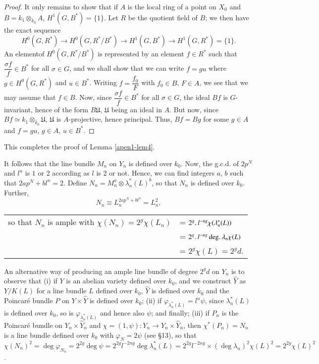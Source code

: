\begin{proof}
It only remains to show that if $A$ is the local ring of a point on $X_0$ and $B = k_1 \otimes_{k_0} A$, $H^1 (G, B^*) = \{1\}$. Let $R$ be the quotient field of $B$; we then have the exact sequence
$$
H^0 (G, R^*) \to H^0 (G, R^*/ B^*) \to H^1 (G, B^*) \to H^1 (G, R^*) = \{1\}.
$$
An element\pageoriginale of $H^0 (G, R^*/B^*)$ is represented by an element $f \in R^*$ such that $\dfrac{\sigma f}{f} \in B^*$ for all $\sigma \in G$, and we shall show that we can write $f= gu$ where $g \in H^0 (G, R^*)$ and $u \in B^*$. Writing $f = \dfrac{f_0}{F}$ with $f_0 \in B$, $F \in A$, we see that we may assume that $f \in B$. Now, since $\dfrac{\sigma f}{f} \in B^*$ for all $\sigma \in G$, the ideal $Bf$ is $G$-invariant, hence of the form $B\mathfrak{U}$, $\mathfrak{U}$ being an ideal in $A$. But now, since $Bf \simeq k_1 \otimes_{k_0} \mathfrak{U}$, $\mathfrak{U}$ is $A$-projective, hence principal. Thus, $Bf = Bg$ for some $g \in A$ and $f = gu$, $g \in A$, $u \in B^*$.
\end{proof}

This completes the proof of Lemma \ref{apen1-lem4}.

It follows that the line bundle $M_n$ on $Y_n$ is defined over $k_0$. Now, the g.c.d. of $2 p^N$ and $l^n$ is $1$ or 2 according as $l$ is 2 or not. Hence, we can find integers $a$, $b$ such that $2ap^N + bl^n =2$. Define $N_n = M^a_n \otimes \lambda^*_n(L)^b$, so that $N_n$ is defined over $k_0$. Further,
$$
N_n \equiv L^{2ap^N+bl^n}_n  = L^2_n,
$$
\begin{tabular}{r@{\;}l}
so that $N_n$ is ample with $\chi(N_n) = 2^g \chi(L_n)$  & = $2^g \ldotp l^{-ng} \chi (\lambda^*_n (L))$\\
& = $2^g \ldotp l^{-ng} \deg \ldotp \lambda_n \chi(L)$\\
& = $2^g \chi (L) = 2^g d$.
\end{tabular}

An alternative way of producing an ample line bundle of degree $2^gd$ on $Y_n$ is to observe that (i) if $Y$ is an abelian variety defined over $k_0$, and we construct $\hat{Y}$ as $Y/K(L)$ for a line bundle $L$ defined over $k_0$, $\hat{Y}$ is defined over $k_0$ and the Poincar\'e bundle $P$ on $Y \times \hat{Y}$ is defined over $k_0$; (ii) if $\varphi_{\lambda^*_n (L)} = l^n \psi$, since $\lambda^*_n(L)$ is defined over $k_0$, so is $\varphi_{\lambda^*_n(L)}$ and hence also $\psi$; and finally; (iii) if $P_n$ is the Poincar\'e bundle on $Y_n \times \hat{Y}_n$ and $\chi=(1,\psi): Y_n\to Y_n \times \hat{Y}_n$, then $\chi^* (P_n) = N_n$ is a line bundle defined over $k_0$ with $\varphi_N = 2 \psi$ (see \S 13), so that $\chi(N_n)^2 = \deg \varphi_{N_n} = 2^{2g} \deg \psi = 2^{2g} l^{-2ng} \deg \lambda^*_n (L) = 2^{2g} l^{-2ng} \times (\deg \lambda_n)^2 \chi (L)^2 = 2^{2g} \chi(L)^2$.

